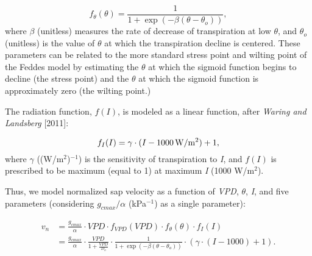 \begin{equation}  %
f_{\theta}(\theta) = \frac{1}{1+\exp(-\beta(\theta-\theta_o))},
\end{equation}
where $\beta$ (unitless) measures the rate of decrease of transpiration at low $\theta$, and $\theta_o$ (unitless) is the value of $\theta$ at which the transpiration decline is centered.  These parameters can be related to the more standard stress point and wilting point of the Feddes model by estimating the $\theta$ at which the sigmoid function begins to decline (the stress point) and the $\theta$ at which the sigmoid function is approximately zero (the wilting point.)

The radiation function, $f(I)$, is modeled as a linear function, after \textit{Waring and Landsberg} [2011]:

\begin{equation}  %
f_I(I) = \gamma \cdot (I-1000 \, {\rm W/m^2})+1,
\end{equation}
where $\gamma$ ((W/m$^2$)$^{-1}$) is the sensitivity of transpiration to \textit{I}, and $f(I)$ is prescribed to be maximum (equal to 1) at maximum \textit{I} (1000 W/m$^2$).

Thus, we model normalized sap velocity as a function of \textit{VPD}, $\theta$, \textit{I}, and five parameters (considering $g_{cmax}/\alpha$ (kPa$^{-1}$) as a single parameter):

\begin{align}
v_n & =  \frac{g_{cmax}}{\alpha} \cdot VPD \cdot f_{VPD}(VPD) \cdot f_{\theta}(\theta) \cdot f_I(I) \nonumber \\ 
& =  \frac{g_{cmax}}{\alpha} \cdot \frac{VPD}{1+\frac{VPD}{D_o}} \cdot \frac{1}{1+\exp(-\beta(\theta-\theta_o))} \cdot (\gamma \cdot (I-1000)+1).
\end{align}

